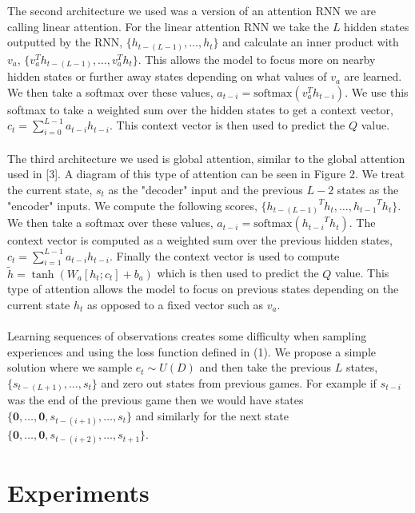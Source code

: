 \documentclass{article}
\begin{document}
The second architecture we used was a version of an attention RNN we are calling 
linear attention. For the linear attention RNN we take the $L$ hidden states
outputted by the RNN, $\{h_{t-(L-1)}, \dots, h_{t}\}$ and calculate an inner
product with $v_a$, $\{v_a^Th_{t-(L-1)}, \dots, v_a^Th_{t}\}$. This allows the
model to focus more on nearby hidden states or further away states depending on
what values of $v_a$ are learned. We then take a softmax over these values,
$a_{t-i} = \text{softmax}(v_a^Th_{t-i})$. We use this softmax to take a weighted
sum over the hidden states to get a context vector,
$c_t = \sum_{i=0}^{L-1}a_{t-i}h_{t-i}$. This context vector is then used to predict
the $Q$ value. \\
\\
The third architecture we used is global attention, similar to the global attention
used in [3]. A diagram of this type of attention can be seen in Figure 2. We treat
the current state, $s_t$ as the "decoder" input and the previous $L - 2$ states as
the "encoder" inputs. We compute the following scores,
$\{{h_{t-(L-1)}}^Th_t, \dots, {h_{t-1}}^Th_t\}$. We then take a softmax over these
values, $a_{t-i} = \text{softmax}({h_{t-i}}^Th_t)$. The context vector is computed
as a weighted sum over the previous hidden states, $c_t = \sum_{i=1}^{L-1}a_{t-i}h_{t-i}$.
Finally the context vector is used to compute $\tilde{h} = \tanh(W_a[h_t;c_t] + b_a)$
which is then used to predict the $Q$ value. This type of attention allows the model
to focus on previous states depending on the current state $h_t$ as opposed to a
fixed vector such as $v_a$. \\
\\
Learning sequences of observations creates some difficulty when sampling
experiences and using the loss function defined in (1). We propose a simple
solution where we sample $e_t \sim U(D)$ and then take the previous $L$ states,
$\{s_{t-(L+1)}, \dots, s_t\}$ and zero out states from previous games. For example
if $s_{t-i}$ was the end of the previous game then we would have states
$\{\mathbf{0}, \dots, \mathbf{0}, s_{t-(i+1)}, \dots, s_t\}$ and similarly for the
next state $\{\mathbf{0}, \dots, \mathbf{0},s_{t-(i+2)}, \dots, s_{t+1}\}$.

\section{Experiments}
\end{document}
